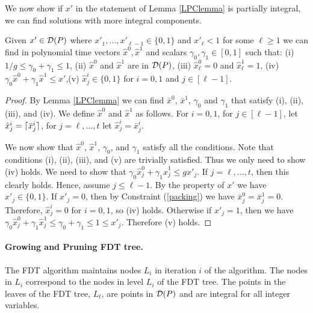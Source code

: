 We now show if $x'$ in the statement of Lemma \ref{LPClemma} is partially integral, we can find solutions with more integral components.
\begin{lemma}\label{round-up}
	Given $x'\in \operatorname{\mathcal{D}}(P)$ where $x'_1,\ldots,x'_{\ell-1}\in \{0,1\}$ and $x'_{\ell}<1$ for some $\ell\geq 1$ we can find in polynomial time vectors $\hat{x}^0,\hat{x}^1$ and scalars $\gamma_0,\gamma_1 \in [0,1]$ such that: (i) ${ 1}/{g}\leq \gamma_0 + \gamma_1  \leq 1$, (ii) $\hat{x}^0$ and $\hat{x}^1$ are in  $\operatorname{\mathcal{D}}( P)$, (iii) $\hat{x}^0_\ell=0$ and $\hat{x}^1_\ell=1$, (iv) $ \gamma_0\hat{x}^0 +\gamma_1 \hat{x}^1 \leq
	x'$,(v) $\hat{x}^i_j\in \{0,1\}$ for $i=0,1$ and $j\in[\ell-1]$.
\end{lemma} 
\begin{proof}
	By Lemma \ref{LPClemma} we can find $\bar{x}^0$, $\bar{x}^1$, $\gamma_0$ and $\gamma_1$ that satisfy (i), (ii), (iii), and (iv). We define $\hat{x}^0$ and $\hat{x}^1$ as follows. For $i=0,1$, for $j\in[\ell-1]$, let $\hat{x}^i_j= \lceil\bar{x}^i_j\rceil$, for $j=\ell,\ldots,t$ let $\hat{x}^i_j = \bar{x}^i_j$.
	
	
	We now show that $\hat{x}^0$, $\hat{x}^1$, $\gamma_0$, and $\gamma_1$ satisfy all the conditions. Note that conditions (i), (ii), (iii), and (v) are trivially satisfied. Thus we only need to show (iv) holds. We need to show that $\gamma_0 \hat{x}^0_j+\gamma_1\hat{x}^1_j\leq gx'_j$. If $j=\ell,\ldots,t$, then this clearly holds. Hence, assume $j\leq \ell-1$. By the property of $x'$ we have $x'_j\in \{0,1\}$. If $x'_j= 0$, then by Constraint (\ref{packing}) we have $\bar{x}^0_j = \bar{x}^1_j=0$. Therefore, $\hat{x}^i_j=0$ for $i=0,1$, so (iv) holds. Otherwise if $x'_j = 1$, then we have
	$\gamma_0\hat{x}^0_j+\gamma_1\hat{x}^1_j\leq \gamma_0+\gamma_1\leq 1\leq x'_j.$ 
	Therefore (v) holds.
\end{proof}

\paragraph{Growing and Pruning FDT tree.} The FDT algorithm maintains nodes $L_i$ in iteration $i$ of the algorithm. The nodes in $L_i$ correspond to the nodes in level $L_i$ of the FDT tree. The points in the leaves of the FDT tree, $L_t$, are points in $\operatorname{\mathcal{D}}(P)$ and are integral for all integer variables.


